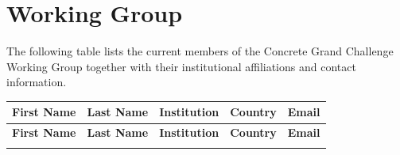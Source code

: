 \section{Working Group}

The following table lists the current members of the Concrete Grand Challenge Working Group together with their institutional affiliations and contact information. %

\footnotesize
\begingroup
\setlength{\tabcolsep}{4pt}
\renewcommand{\arraystretch}{1.65}
\begin{longtable}{@{}
  >{\raggedright\arraybackslash}p{}
  >{\raggedright\arraybackslash}p{}
  >{\raggedright\arraybackslash}p{}
  >{\raggedright\arraybackslash}p{}
  >{\raggedright\arraybackslash}p{}
@{}}
\hline
\textbf{First Name} &
\textbf{Last Name} &
\textbf{Institution} &
\textbf{Country} &
\textbf{Email} \\
\hline
\endfirsthead

\hline
\textbf{First Name} &
\textbf{Last Name} &
\textbf{Institution} &
\textbf{Country} &
\textbf{Email} \\
\hline
\endhead

\hline
\endfoot


\end{longtable}
